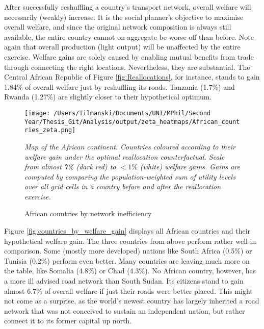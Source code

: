 \documentclass[11pt, oneside]{article}   	%
\newcommand{\mysubcaption}[1]{
\justify
\begin{spacing}{0.7}
\textit{\footnotesize #1}
\end{spacing}}
\begin{document}
After successfully reshuffling a country's transport network, overall welfare will necessarily (weakly) increase. It is the social planner's objective to maximise overall welfare, and since the original network composition is always still available, the entire country cannot on aggregate be worse off than before. Note again that overall production (light output) will be unaffected by the entire exercise. Welfare gains are solely caused by enabling mutual benefits from trade through connecting the right locations. Nevertheless, they are substantial. The Central African Republic of Figure \eqref{fig:Reallocations}, for instance, stands to gain 1.84\% of overall welfare just by reshuffling its roads. Tanzania (1.7\%) and Rwanda (1.27\%) are slightly closer to their hypothetical optimum.

\begin{figure}
\centering
\caption{African countries by network inefficiency}
\texttt{[image: /Users/Tilmanski/Documents/UNI/MPhil/Second Year/Thesis\_Git/Analysis/output/zeta\_heatmaps/African\_countries\_zeta.png]}

\label{fig:countries_by_welfare_gain}
\mysubcaption{Map of the African continent. Countries coloured according to their welfare gain under the optimal reallocation counterfactual. Scale from almost 7\% (dark red) to $<1\%$ (white) welfare gains. Gains are computed by comparing the population-weighted sum of utility levels over all grid cells in a country before and after the reallocation exercise.}
\end{figure}

Figure \eqref{fig:countries_by_welfare_gain} displays all African countries and their hypothetical welfare gain. The three countries from above perform rather well in comparison. Some (mostly more developed) nations like South Africa (0.5\%) or Tunisia (0.2\%) perform even better. Many countries are leaving much more on the table, like Somalia (4.8\%) or Chad (4.3\%). No African country, however, has a more ill advised road network than South Sudan. Its citizens stand to gain almost 6.7\% of overall welfare if just their roads were better placed. This might not come as a surprise, as the world's newest country has largely inherited a road network that was not conceived to sustain an independent nation, but rather connect it to its former capital up north.
\end{document}
